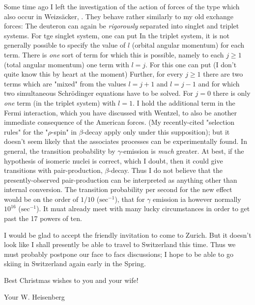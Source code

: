 Some time ago I left the investigation of the action of forces of the type
which also occur in Weizs\"acker, . They behave rather similarly to my old exchange forces:
The deuteron can again be \textit{rigorously} separated into singlet and triplet systems. For tge singlet system, one can put
In the triplet system, it is not generally possible to specify the value of $l$ (orbital angular momentum) for each term. There is \textit{one} sort of term for which this is possible, namely to each $j\ge 1$ (total angular momentum) one term with $l=j$. For this one can put (I don't quite know this by heart at the moment)
Further, for every $j\ge 1$ there are two terms which are "mixed" from the values $l=j+1$ and $l=j-1$ and for which two simultaneous Schr\"odinger equations have to be solved. For $j=0$ there is only \textit{one} term (in the triplet system) with $l=1$.  I hold the additional term in the Fermi interaction, which you have discussed with Wentzel, to also be another immediate consequence of the American forces. (My recently-cited "selection rules" for the "$\rho$-spin" in $\beta$-decay apply only under this supposition); but it doesn't seem likely that the associates processes can be experimentally found. In general, the transition probability by $\gamma$-emission is \textit{much} greater. At best, if the hypothesis of isomeric nuclei is correct, which I doubt, then it could give transitions with pair-production,  $\beta$-decay. Thus I do not believe that the presently-observed pair-production can be interpreted as anything other than internal conversion. The transition probability per second for the new effect would be on the order of $1/10$ ($\text{sec}^{-1}$), that for $\gamma$ emission ia however normally $10^16$ ($\text{sec}^{-1}$). It muat already meet with many lucky circumstances in order to get past the 17 powers of ten.


I would be glad to accept the friendly invitation to come to Zurich. But it doesn't look like I shall presently be able to travel to Switzerland this time. Thus we must probably postpone our face to facs discussions; I hope to be able to go skiing in Switzerland again early in the Spring.

Best Christmas wishes to you and your wife!

Your W. Heisenberg

